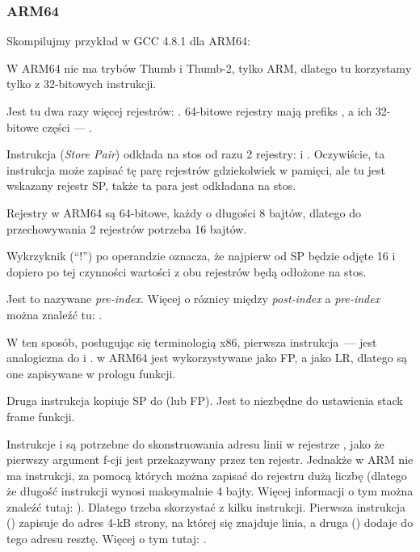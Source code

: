 \subsubsection{ARM64}


Skompilujmy przykład w GCC 4.8.1 dla ARM64:



W ARM64 nie ma trybów Thumb i Thumb-2, tylko ARM, dlatego tu korzystamy tylko z 32-bitowych instrukcji.

Jest tu dwa razy więcej rejestrów: .
64-bitowe rejestry mają prefiks 
, a ich 32-bitowe części --- .

Instrukcja  (\emph{Store Pair}) 
odkłada na stos od razu 2 rejestry:  i .
Oczywiście, ta instrukcja może zapisać tę parę rejestrów gdziekolwiek w pamięci, ale tu jest wskazany rejestr \ac{SP}, także ta para jest odkładana na stos.

Rejestry w ARM64 są 64-bitowe, każdy o długości 8 bajtów, dlatego do przechowywania 2 rejestrów potrzeba 16 bajtów.

Wykrzyknik (``!'') po operandzie oznacza, że najpierw od \ac{SP} będzie odjęte 16 i dopiero po tej czynności wartości z obu rejestrów będą odłożone na stos.

Jest to nazywane \emph{pre-index}.
Więcej o róznicy między \emph{post-index} a \emph{pre-index} 
można znaleźć tu: .

W ten sposób, posługując się terminologią x86, pierwsza instrukcja~--- jest analogiczna do  i .
 w ARM64 jest wykorzystywane jako \ac{FP}, a  
jako \ac{LR}, dlatego są one zapisywane w prologu funkcji.

Druga instrukcja kopiuje \ac{SP} do  (lub \ac{FP}).
Jest to niezbędne do ustawienia stack frame funkcji.

\label{pointers_ADRP_and_ADD}
Instrukcje  i \ADD są potrzebne do skonstruowania adresu linii  w rejestrze , 
jako że pierwszy argument f-cji jest przekazywany przez ten rejestr.
Jednakże w ARM nie ma instrukcji, za pomocą których można zapisać do rejestru dużą liczbę 
(dlatego że długość instrukcji wynosi maksymalnie 4 bajty. Więcej informacji o tym można znaleźć tutaj: ).
Dlatego trzeba skorzystać z kilku instrukcji.
Pierwsza instrukcja () zapisuje do  adres 4-kB strony, na której się znajduje linia, 
a druga (\ADD) dodaje do tego adresu resztę.
Więcej o tym tutaj: .

